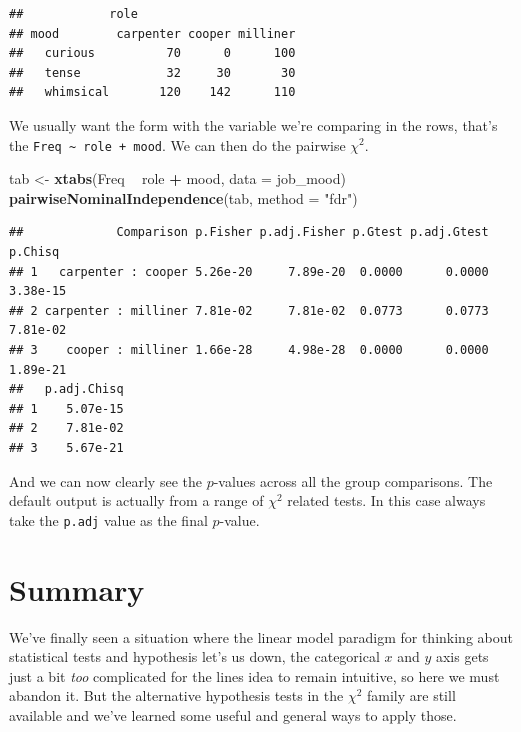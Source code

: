 \documentclass[
]{book}
\newenvironment{Shaded}{\begin{snugshade}}{\end{snugshade}}
\newcommand{\DataTypeTok}[1]{\textcolor[rgb]{0.13,0.29,0.53}{#1}}
\newcommand{\KeywordTok}[1]{\textcolor[rgb]{0.13,0.29,0.53}{\textbf{#1}}}
\newcommand{\NormalTok}[1]{#1}
\newcommand{\OperatorTok}[1]{\textcolor[rgb]{0.81,0.36,0.00}{\textbf{#1}}}
\newcommand{\StringTok}[1]{\textcolor[rgb]{0.31,0.60,0.02}{#1}}
\begin{document}
\begin{verbatim}
##            role
## mood        carpenter cooper milliner
##   curious          70      0      100
##   tense            32     30       30
##   whimsical       120    142      110
\end{verbatim}

We usually want the form with the variable we're comparing in the rows, that's the \texttt{Freq\ \textasciitilde{}\ role\ +\ mood}. We can then do the pairwise \(\chi^2\).

\begin{Shaded}
\begin{Highlighting}[]
\NormalTok{tab <-}\StringTok{ }\KeywordTok{xtabs}\NormalTok{(Freq }\OperatorTok{~}\StringTok{ }\NormalTok{role }\OperatorTok{+}\StringTok{ }\NormalTok{mood, }\DataTypeTok{data =}\NormalTok{ job_mood)}
\KeywordTok{pairwiseNominalIndependence}\NormalTok{(tab, }\DataTypeTok{method =} \StringTok{"fdr"}\NormalTok{)}
\end{Highlighting}
\end{Shaded}

\begin{verbatim}
##             Comparison p.Fisher p.adj.Fisher p.Gtest p.adj.Gtest  p.Chisq
## 1   carpenter : cooper 5.26e-20     7.89e-20  0.0000      0.0000 3.38e-15
## 2 carpenter : milliner 7.81e-02     7.81e-02  0.0773      0.0773 7.81e-02
## 3    cooper : milliner 1.66e-28     4.98e-28  0.0000      0.0000 1.89e-21
##   p.adj.Chisq
## 1    5.07e-15
## 2    7.81e-02
## 3    5.67e-21
\end{verbatim}

And we can now clearly see the \(p\)-values across all the group comparisons. The default output is actually from a range of \(\chi^2\) related tests. In this case always take the \texttt{p.adj} value as the final \(p\)-value.

\hypertarget{summary}{%
\section{Summary}\label{summary}}

We've finally seen a situation where the linear model paradigm for thinking about statistical tests and hypothesis let's us down, the categorical \(x\) and \(y\) axis gets just a bit \emph{too} complicated for the lines idea to remain intuitive, so here we must abandon it. But the alternative hypothesis tests in the \(\chi^2\) family are still available and we've learned some useful and general ways to apply those.
\end{document}
